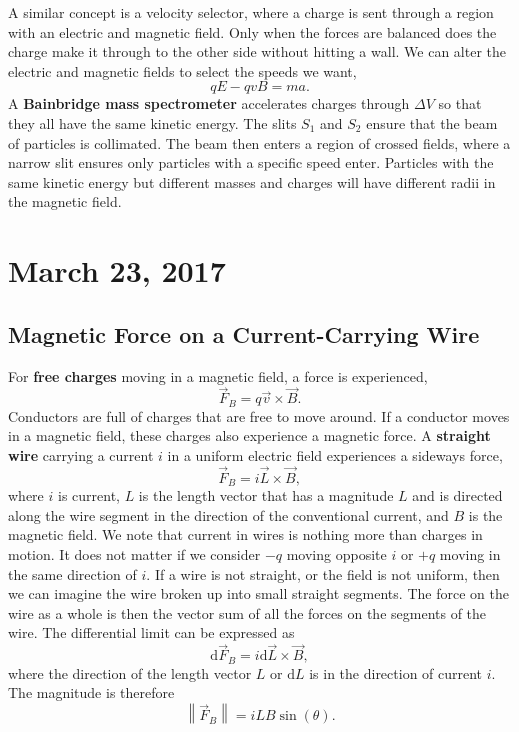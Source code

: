 \documentclass[11pt]{article}
\theoremstyle{plain} %
\theoremstyle{definition}
\theoremstyle{example}
\theoremstyle{remark}
\begin{document}
A similar concept is a velocity selector, where a charge is sent through a region with an electric and magnetic field. Only when the forces are balanced does the charge make it through to the other side without hitting a wall. We can alter the electric and magnetic fields to select the speeds we want, 
$$qE-qvB = ma.$$
A \textbf{Bainbridge mass spectrometer} accelerates charges through $\Delta V$ so that they all have the same kinetic energy. The slits $S_1$ and $S_2$ ensure that the beam of particles is collimated. The beam then enters a region of crossed fields, where a narrow slit ensures only particles with a specific speed enter. Particles with the same kinetic energy but different masses and charges will have different radii in the magnetic field. 

\section{March 23, 2017}
\subsection{Magnetic Force on a Current-Carrying Wire}

For \textbf{free charges} moving in a magnetic field, a force is experienced, 
$$\vec{F}_B = q\vec{v} \times \vec{B}.$$
Conductors are full of charges that are free to move around. If a conductor moves in a magnetic field, these charges also experience a magnetic force. A \textbf{straight wire} carrying a current $i$ in a uniform electric field experiences a sideways force, 
$$\vec{F}_B = i\vec{L} \times \vec{B},$$
where $i$ is current, $L$ is the length vector that has a magnitude $L$ and is directed along the wire segment in the direction of the conventional current, and $B$ is the magnetic field. We note that current in wires is nothing more than charges in motion. It does not matter if we consider $-q$ moving opposite $i$ or $+q$ moving in the same direction of $i$. 
If a wire is not straight, or the field is not uniform, then we can imagine the wire broken up into small straight segments. The force on the wire as a whole is then the vector sum of all the forces on the segments of the wire. The differential limit can be expressed as 
$$\mathrm d \vec{F}_B = i \mathrm d \vec{L} \times \vec{B},$$
where the direction of the length vector $L$ or $\mathrm d L$ is in the direction of current $i$. 
The magnitude is therefore 
$$\left\|\vec{F}_B\right\| = iLB\sin(\theta).$$
\end{document}
